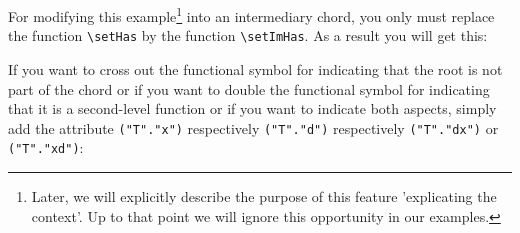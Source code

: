 \documentclass[
  DIV=calc,
  BCOR=5mm,
  12pt,
  headings=small,
  oneside,
  abstract=true,
  toc=bib,
  xcolor=dvipsnames,
  openany,
  english]{scrartcl}
\begin{document}
\begin{center}
\end{center}

For modifying this example\footnote{Later, we will explicitly describe the
purpose of this feature 'explicating the context'. Up to that point we will
ignore this opportunity in our examples.} into an intermediary chord, you only
must replace the function \texttt{\textbackslash setHas} by the function
\texttt{\textbackslash setImHas}. As a result you will get this:

\begin{center}
\end{center}

If you want to cross out the functional symbol for indicating that the root is
not part of the chord or if you want to double the functional symbol for
indicating that it is a second-level function or if you want to indicate both
aspects, simply add the attribute \verb|("T"."x")| respectively
\verb|("T"."d")| respectively \verb|("T"."dx")| or \verb|("T"."xd")|:
\end{document}
